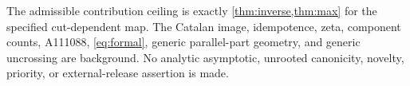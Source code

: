 \documentclass[10pt,a4paper]{amsart}
\theoremstyle{definition}
\theoremstyle{remark}
\begin{document}
The admissible contribution ceiling is exactly \cref{thm:inverse,thm:max}
for the specified cut-dependent map.  The Catalan image, idempotence, zeta,
component counts, A111088, \eqref{eq:formal}, generic parallel-part geometry,
and generic uncrossing are background.  No analytic asymptotic, unrooted
canonicity, novelty, priority, or external-release assertion is made.



\end{document}
